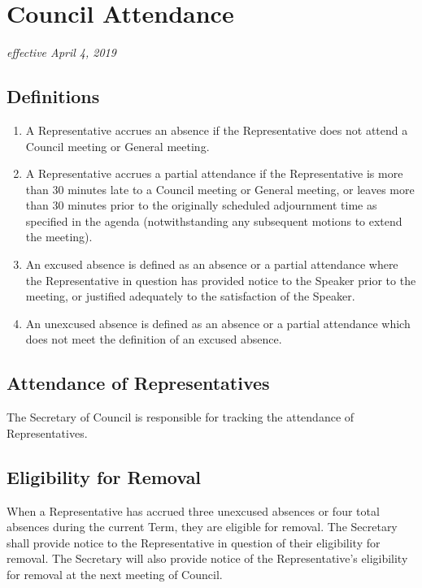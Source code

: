 \section{Council Attendance}
\emph{effective April 4, 2019}

\subsection{Definitions}

\begin{enumerate}

\item A Representative accrues an absence if the Representative does not attend a Council meeting or General meeting.
\item A Representative accrues a partial attendance if the Representative is more than 30 minutes late to a Council meeting or General meeting, or leaves more than 30 minutes prior to the originally scheduled adjournment time as specified in the agenda (notwithstanding any subsequent motions to extend the meeting).
\item An excused absence is defined as an absence or a partial attendance where the Representative in question has provided notice to the Speaker prior to the meeting, or justified adequately to the satisfaction of the Speaker.
\item An unexcused absence is defined as an absence or a partial attendance which does not meet the definition of an excused absence.

\end{enumerate}

\subsection{Attendance of Representatives}

The Secretary of Council is responsible for tracking the attendance of Representatives. 

\subsection{Eligibility for Removal}

When a Representative has accrued three unexcused absences or four total absences during the current Term, they are eligible for removal. The Secretary shall provide notice to the Representative in question of their eligibility for removal. The Secretary will also provide notice of the Representative’s eligibility for removal at the next meeting of Council. 

